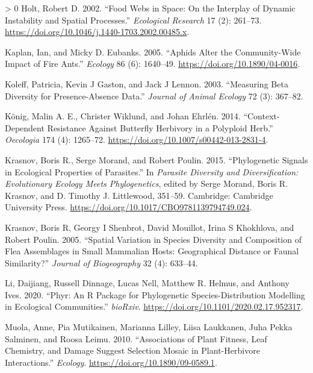 \documentclass[12pt]{article}
\newlength{\cslhangindent}
\newenvironment{CSLReferences}[3] %
 {%
  \setlength{\parindent}{0pt}
  \ifodd #1 \everypar{\setlength{\hangindent}{\cslhangindent}}\ignorespaces\fi
  \ifnum #2 > 0
  \setlength{\parskip}{#2\baselineskip}
  \fi
 }%
 {}
\begin{document}
\begin{CSLReferences}{1}{0}
\leavevmode\hypertarget{ref-Holt2002FooWeb}{}%
Holt, Robert D. 2002. {``Food Webs in Space: On the Interplay of Dynamic
Instability and Spatial Processes.''} \emph{Ecological Research} 17 (2):
261--73. \url{https://doi.org/10.1046/j.1440-1703.2002.00485.x}.

\leavevmode\hypertarget{ref-Kaplan2005AphAlt}{}%
Kaplan, Ian, and Micky D. Eubanks. 2005. {``Aphids Alter the
Community-Wide Impact of Fire Ants.''} \emph{Ecology} 86 (6): 1640--49.
\url{https://doi.org/10.1890/04-0016}.

\leavevmode\hypertarget{ref-Koleff2003MeaBet}{}%
Koleff, Patricia, Kevin J Gaston, and Jack J Lennon. 2003. {``Measuring
Beta Diversity for Presence-Absence Data.''} \emph{Journal of Animal
Ecology} 72 (3): 367--82.

\leavevmode\hypertarget{ref-Konig2014ConRes}{}%
König, Malin A. E., Christer Wiklund, and Johan Ehrlén. 2014.
{``Context-Dependent Resistance Against Butterfly Herbivory in a
Polyploid Herb.''} \emph{Oecologia} 174 (4): 1265--72.
\url{https://doi.org/10.1007/s00442-013-2831-4}.

\leavevmode\hypertarget{ref-Krasnov2015PhySig}{}%
Krasnov, Boris R., Serge Morand, and Robert Poulin. 2015.
{``Phylogenetic Signals in Ecological Properties of Parasites.''} In
\emph{Parasite Diversity and Diversification: Evolutionary Ecology Meets
Phylogenetics}, edited by Serge Morand, Boris R. Krasnov, and D. Timothy
J. Littlewood, 351--59. Cambridge: Cambridge University Press.
\url{https://doi.org/10.1017/CBO9781139794749.024}.

\leavevmode\hypertarget{ref-Krasnov2005SpaVar}{}%
Krasnov, Boris R, Georgy I Shenbrot, David Mouillot, Irina S Khokhlova,
and Robert Poulin. 2005. {``Spatial Variation in Species Diversity and
Composition of Flea Assemblages in Small Mammalian Hosts: Geographical
Distance or Faunal Similarity?''} \emph{Journal of Biogeography} 32 (4):
633--44.

\leavevmode\hypertarget{ref-Li2020PhyRP}{}%
Li, Daijiang, Russell Dinnage, Lucas Nell, Matthew R. Helmus, and
Anthony Ives. 2020. {``Phyr: An R Package for Phylogenetic
Species-Distribution Modelling in Ecological Communities.''}
\emph{bioRxiv}. \url{https://doi.org/10.1101/2020.02.17.952317}.

\leavevmode\hypertarget{ref-Muola2010AssPla}{}%
Muola, Anne, Pia Mutikainen, Marianna Lilley, Liisa Laukkanen, Juha
Pekka Salminen, and Roosa Leimu. 2010. {``Associations of Plant Fitness,
Leaf Chemistry, and Damage Suggest Selection Mosaic in Plant-Herbivore
Interactions.''} \emph{Ecology}.
\url{https://doi.org/10.1890/09-0589.1}.


\end{CSLReferences}
\end{document}
